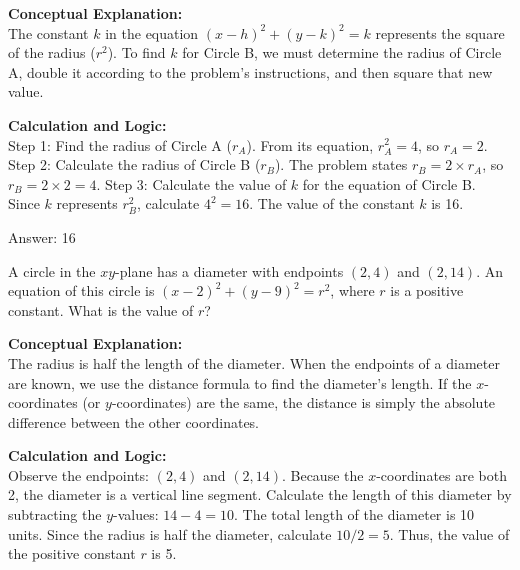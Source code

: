 \documentclass[11pt,paper=a4,answers]{exam}
\begin{document}
\begin{questions}
\begin{solution}
\textbf{Conceptual Explanation:} \\
The constant $k$ in the equation $(x - h)^2 + (y - k)^2 = k$ represents the square of the radius ($r^2$). To find $k$ for Circle B, we must determine the radius of Circle A, double it according to the problem's instructions, and then square that new value.

\vspace{30pt}

\textbf{Calculation and Logic:} \\
Step 1: Find the radius of Circle A ($r_A$). From its equation, $r_A^2 = 4$, so $r_A = 2$. Step 2: Calculate the radius of Circle B ($r_B$). The problem states $r_B = 2 \times r_A$, so $r_B = 2 \times 2 = 4$. Step 3: Calculate the value of $k$ for the equation of Circle B. Since $k$ represents $r_B^2$, calculate $4^2 = 16$. The value of the constant $k$ is 16.

\vspace{30pt}

Answer: \colorbox{yellow!100}{16}
\end{solution}

\vspace{60pt}

\question
A circle in the $xy$-plane has a diameter with endpoints $(2, 4)$ and $(2, 14)$. An equation of this circle is $(x - 2)^2 + (y - 9)^2 = r^2$, where $r$ is a positive constant. What is the value of $r$?

\begin{solution}
\textbf{Conceptual Explanation:} \\
The radius is half the length of the diameter. When the endpoints of a diameter are known, we use the distance formula to find the diameter's length. If the $x$-coordinates (or $y$-coordinates) are the same, the distance is simply the absolute difference between the other coordinates.

\vspace{30pt}

\textbf{Calculation and Logic:} \\
Observe the endpoints: $(2, 4)$ and $(2, 14)$. Because the $x$-coordinates are both 2, the diameter is a vertical line segment. Calculate the length of this diameter by subtracting the $y$-values: $14 - 4 = 10$. The total length of the diameter is 10 units. Since the radius is half the diameter, calculate $10 / 2 = 5$. Thus, the value of the positive constant $r$ is 5.


\end{solution}
\end{questions}
\end{document}
